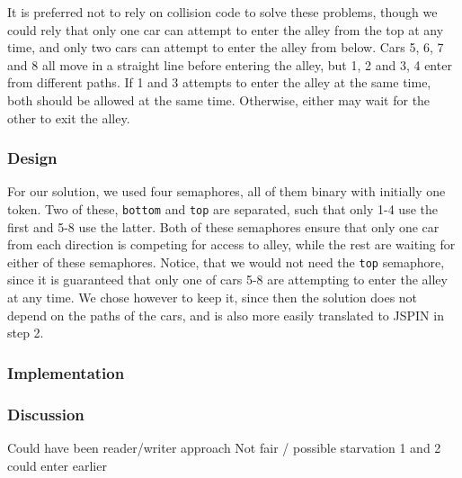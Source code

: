 It is preferred not to rely on collision code to solve these problems, though we could rely that only one car can attempt to enter the alley from the top at any time, and only two cars can attempt to enter the alley from below. Cars 5, 6, 7 and 8 all move in a straight line before entering the alley, but 1, 2 and 3, 4 enter from different paths. If 1 and 3 attempts to enter the alley at the same time, both should be allowed at the same time. Otherwise, either may wait for the other to exit the alley.

\subsubsection*{Design}
For our solution, we used four semaphores, all of them binary with initially one token. Two of these, \texttt{bottom} and \texttt{top} are separated, such that only 1-4 use the first and 5-8 use the latter. Both of these semaphores ensure that only one car from each direction is competing for access to alley, while the rest are waiting for either of these semaphores. Notice, that we would not need the \texttt{top} semaphore, since it is guaranteed that only one of cars 5-8 are attempting to enter the alley at any time. We chose however to keep it, since then the solution does not depend on the paths of the cars, and is also more easily translated to JSPIN in step 2.

\subsubsection*{Implementation}

\subsubsection{Discussion}
Could have been reader/writer approach
Not fair / possible starvation
1 and 2 could enter earlier